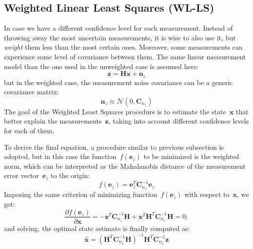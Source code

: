 \subsection{Weighted Linear Least Squares (WL-LS)}
In case we have a different confidence level for each measurement. Instead of throwing away the most uncertain measurements, it is wise to also use it, but \textit{weight} them less than the most certain ones. Moreover, some measurements can experience some level of covariance between them. The same linear measurement model than the one used in the unweighted case is assumed here:
\begin{equation}
 \mathbf{z} = \mathbf{H}\mathbf{x} + \mathbf{n}_z
\end{equation}
but in the weighted case, the measurement noise covariance can be a generic covariance matrix:
\begin{equation}
 \mathbf{n}_z \approx \mathcal{N}(0,\mathbf{C}_{n_z})
\end{equation}
The goal of the Weighted Least Squares procedure is to estimate the state~$\mathbf{x}$ that better explain the measurements~$\mathbf{z}$, taking into account different confidence levels for each of them.

To derive the final equation, a procedure similar to previous subsection is adopted, but in this case the function~$f(\mathbf{e}_z)$ to be minimized is the weighted norm, which can be interpreted as the Mahalanobis distance of the measurement error vector~$\mathbf{e}_z$ to the origin:
\begin{equation}
 f(\mathbf{e}_z) = \mathbf{e}^T_z\mathbf{C}^{-1}_{n_z}\mathbf{e}_z
\end{equation}
Imposing the same criterion of minimizing function~$f(\mathbf{e}_z)$ with respect to~$\mathbf{x}$, we get: 
\begin{equation}
 \frac{\partial f(\mathbf{e}_z)}{\partial \mathbf{x}} = 
 -\mathbf{z}^T\mathbf{C}^{-1}_{n_z}\mathbf{H} + \mathbf{x}^T\mathbf{H}^T\mathbf{C}^{-1}_{n_z}\mathbf{H} = 0; 
\end{equation}
and solving, the optimal state estimate is finally computed as:
\begin{equation}
\label{eq:wl_least_squares}
 \hat{\mathbf{x}} = (\mathbf{H}^T\mathbf{C}^{-1}_{n_z}\mathbf{H})^{-1}\mathbf{H}^T\mathbf{C}^{-1}_{n_z}\mathbf{z}
\end{equation}

